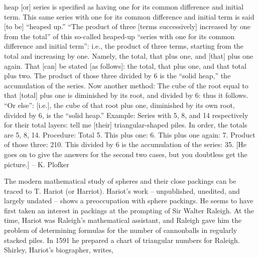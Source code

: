 { {\narrower
    [This] heap [or] series is specified as having one for its common
 difference and initial term. This same series with one for its common
 difference and initial term is said [to be] ``heaped up.'' ``The
 product of three [terms successively] increased by one from the total''
 of this so-called heaped-up ``series with one for its common
 difference and initial term'': i.e., the product of three terms, starting
 from the total and increasing by one. Namely, the total, that plus one,
 and [that] plus one again. That [can] be stated [as follows]: the total,
 that plus one, and that total plus two. The product of those three
 divided by 6 is the ``solid heap,'' the accumulation of the series.
 Now another method: The cube of the root equal to that [total] plus
 one is diminished by its root, and divided by 6: thus it follows.
 ``Or else'': [i.e.], the cube of that root plus one, diminished by
 its own root, divided by 6, is the ``solid heap.''
    Example: Series with 5, 8, and 14 respectively for their total layers:
 tell me [their] triangular-shaped piles.
    In order, the totals are 5, 8, 14.
    Procedure: Total 5. This plus one: 6. This plus one again: 7. Product
 of those three: 210. This divided by 6 is the accumulation of the series:
 35.
    [He goes on to give the answers for the second two cases, but you
 doubtless get the picture.]   --  K. Plofker
 }


}



The modern mathematical study of spheres and their close packings can be
traced to T. Hariot (or Harriot).  
Hariot's work -- unpublished, unedited,
and largely undated -- shows a preoccupation with sphere packings.
He seems to have first taken an interest in packings at the
prompting of Sir Walter Raleigh.  
At the time, Hariot was Raleigh's
mathematical assistant,  and Raleigh gave him the problem of determining
formulas for the number of cannonballs in regularly stacked piles.
In 1591 he prepared a chart of triangular numbers for Raleigh.
Shirley, Hariot's biographer, writes,

